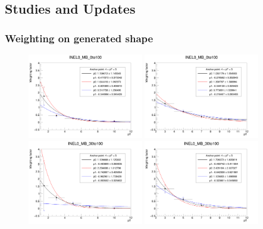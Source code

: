 \clearpage
\subsection{Studies and Updates} \label{subsec:update}

\subsubsection{Weighting on generated \pt shape} \label{subsubsec:weighting}

\begin{figure}[b]
    \centering
    \includegraphics[width=0.45\textwidth]{plots/s2_pTW1to12_INEL0_MB_0to100.png}
    \includegraphics[width=0.45\textwidth]{plots/s2_pTW2to12_INEL0_MB_0to100.png}
    \includegraphics[width=0.45\textwidth]{plots/s2_pTW1to12_INEL0_MB_30to100.png}
    \includegraphics[width=0.45\textwidth]{plots/s2_pTW2to12_INEL0_MB_30to100.png}

\end{figure}
